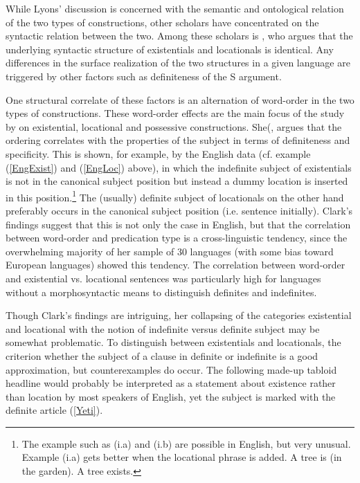 While Lyons' discussion is concerned with the semantic and ontological relation of the two types of constructions, other scholars have concentrated on the syntactic relation between the two. 
Among these scholars is \citet{Freeze:1992}, who argues that the underlying syntactic structure of existentials and locationals is identical. 
Any differences in the surface realization of the two structures in a given language are triggered by other factors such as definiteness of the S argument.

One structural correlate of these factors is an alternation of word-order in the two types of constructions. 
These word-order effects are the main focus of the study by \citet{Clark:1978} on existential, locational and possessive constructions.
She(, argues that the ordering correlates with the properties of the subject in terms of definiteness and specificity.
This is shown, for example, by the English data (cf. example (\ref{EngExist}) and (\ref{EngLoc}) above), in which the indefinite subject of existentials is not in the canonical subject position but instead a dummy location is inserted in this position.\footnote{The example such as (i.a) and (i.b) are possible in English, but very unusual. Example (i.a) gets better when the locational phrase is added.
\eal
\ex A tree is (in the garden).
\ex A tree exists.
\zllast
}
The (usually) definite subject of locationals on the other hand preferably occurs in the canonical subject position (i.e. sentence initially).
Clark's findings suggest that this is not only the case in English, but that the correlation between word-order and predication type is a cross-linguistic tendency, since the overwhelming majority of her sample of 30 languages (with some bias toward European languages) showed this tendency. 
The correlation between word-order and existential vs. locational sentences was particularly high for languages without a morphosyntactic means to distinguish definites and indefinites.

Though Clark's findings are intriguing, her collapsing of the categories existential and locational with the notion of indefinite versus definite subject may be somewhat problematic. To distinguish between existentials and locationals, the criterion whether the subject of a clause in definite or indefinite is a good approximation, but counterexamples do occur. 
The following made-up tabloid headline would probably be interpreted as a statement about existence rather than location by most speakers of English, yet the subject is marked with the definite article (\ref{Yeti}).\enlargethispage{\baselineskip}

